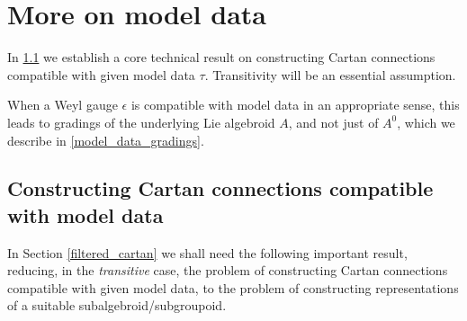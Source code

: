 \documentclass[leqno,12pt]{amsart} %
\newcommand\refreshpage{\newpage}
\newcommand\refreshpage{}
\begin{document}



\refreshpage

\refreshpage
\section{More on model data}\label{modeldata}
In \ref{constructing} we establish a core technical result on constructing Cartan connections
compatible with given model data $\tau$. Transitivity will be an essential assumption.

When a Weyl gauge $\epsilon$ is compatible with model data in an appropriate sense, this
leads to gradings of the underlying Lie algebroid $A$, and not just of $A^0$, which we
describe in \ref{model_data_gradings}.

\subsection{Constructing Cartan connections compatible with model data}\label{constructing}
In Section \ref{filtered_cartan} we shall need the following important result, reducing,
in the {\em transitive} case, the problem of constructing Cartan connections compatible
with given model data, to the problem of constructing representations of a suitable
subalgebroid/subgroupoid.
\end{document}
